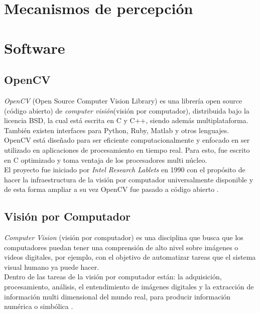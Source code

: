 \documentclass{iccmemoria}
\begin{document}
\section{Mecanismos de percepción}

\section{Software}

\subsection{OpenCV}

\emph{OpenCV} (Open Source Computer Vision Library) es una librería open source (código abierto) de \emph{computer visión}(visión por computador), distribuida bajo la licencia BSD, la cual está escrita en C y C++, siendo además multiplataforma. También existen interfaces para Python, Ruby, Matlab y otros lenguajes.\\

OpenCV está diseñado para ser eficiente computacionalmente y enfocado en ser utilizado en aplicaciones de procesamiento en tiempo real. Para esto, fue escrito en C optimizado y toma ventaja de los procesadores multi núcleo.\\

El proyecto fue iniciado por \emph{Intel Research Lablets} en 1990 con el propósito de hacer la infraestructura de la visión por computador universalmente disponible y de esta forma ampliar a su vez OpenCV fue pasado a código abierto \cite{bradski2008learning}.\\

\subsection{Visión por Computador}

\emph{Computer Vision} (visión por computador) es una disciplina que busca que los computadores puedan tener una comprensión de alto nivel sobre imágenes o videos digitales, por ejemplo, con el objetivo de automatizar tareas que el sistema visual humano ya puede hacer\cite{ballard1982computer, vandoni1996proceedings, sonka2008image}.\\

Dentro de las tareas de la visión por computador están: la adquisición, procesamiento, análisis, el entendimiento de imágenes digitales y la extracción de información multi dimensional del mundo real, para producir información numérica o simbólica \cite{klette2014concise, shapiro2001computer, morris2004computer, forsyth2003computer}.\\
\end{document}
